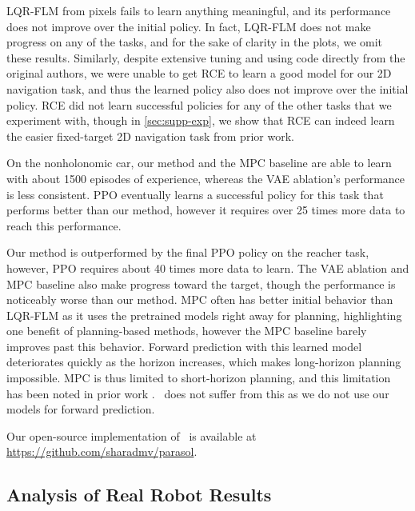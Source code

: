 LQR-FLM from pixels fails to learn anything meaningful, and its performance does not improve over the initial policy. In fact, LQR-FLM does not make progress on any of the tasks, and for the sake of clarity in the plots, we omit these results. Similarly, despite extensive tuning and using code directly from the original authors, we were unable to get RCE to learn a good model for our 2D navigation task, and thus the learned policy also does not improve over the initial policy. RCE did not learn successful policies for any of the other tasks that we experiment with, though in \autoref{sec:supp-exp}, we show that RCE can indeed learn the easier fixed-target 2D navigation task from prior work.

On the nonholonomic car, our method and the MPC baseline are able to learn with about 1500 episodes of experience, whereas the VAE ablation's performance is less consistent. PPO eventually learns a successful policy for this task that performs better than our method, however it requires over 25 times more data to reach this performance.

Our method is outperformed by the final PPO policy on the reacher task, however, PPO requires about 40 times more data to learn. The VAE ablation and MPC baseline also make progress toward the target, though the performance is noticeably worse than our method. MPC often has better initial behavior than LQR-FLM as it uses the pretrained models right away for planning, highlighting one benefit of planning-based methods, however the MPC baseline barely improves past this behavior. Forward prediction with this learned model deteriorates quickly as the horizon increases, which makes long-horizon planning impossible. MPC is thus limited to short-horizon planning, and this limitation has been noted in prior work \citep{nn-dyn,mbve}. \metabbr\ does not suffer from this as we do not use our models for forward prediction.

Our open-source implementation of \metabbr\ is available at \mbox{\footnotesize{\url{https://github.com/sharadmv/parasol}}.}

\subsection{Analysis of Real Robot Results}

